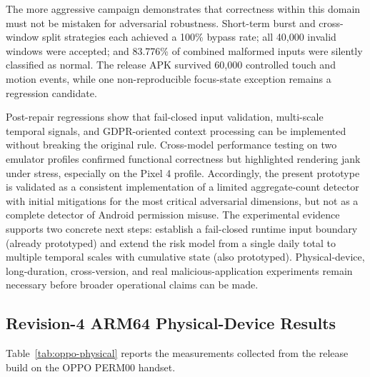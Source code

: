 The more aggressive campaign demonstrates that correctness within this domain must not be mistaken for adversarial robustness. Short-term burst and cross-window split strategies each achieved a 100\% bypass rate; all 40,000 invalid windows were accepted; and 83.776\% of combined malformed inputs were silently classified as normal. The release APK survived 60,000 controlled touch and motion events, while one non-reproducible focus-state exception remains a regression candidate.

Post-repair regressions show that fail-closed input validation, multi-scale temporal signals, and GDPR-oriented context processing can be implemented without breaking the original rule. Cross-model performance testing on two emulator profiles confirmed functional correctness but highlighted rendering jank under stress, especially on the Pixel 4 profile. Accordingly, the present prototype is validated as a consistent implementation of a limited aggregate-count detector with initial mitigations for the most critical adversarial dimensions, but not as a complete detector of Android permission misuse. The experimental evidence supports two concrete next steps: establish a fail-closed runtime input boundary (already prototyped) and extend the risk model from a single daily total to multiple temporal scales with cumulative state (also prototyped). Physical-device, long-duration, cross-version, and real malicious-application experiments remain necessary before broader operational claims can be made.
\subsection{Revision-4 ARM64 Physical-Device Results}

Table~\ref{tab:oppo-physical} reports the measurements collected from the release build on the OPPO PERM00 handset.

